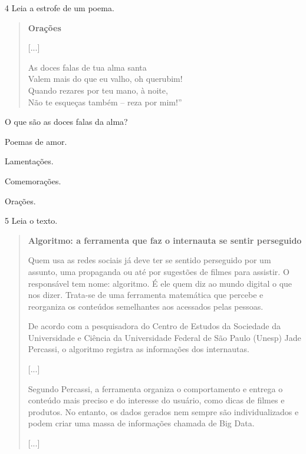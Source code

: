 
\pagebreak
\num{4} Leia a estrofe de um poema.

\begin{verse}
\textbf{Orações}

{[}...{]}

As doces falas de tua alma santa\\
Valem mais do que eu valho, oh querubim!\\
Quando rezares por teu mano, à noite,\\
Não te esqueças também – reza por mim!”

\end{verse}

O que são as doces falas da alma?

\begin{minipage}{.5\textwidth}
\begin{escolha}
\item Poemas de amor.

\item Lamentações.

\item Comemorações.

\item Orações.
\end{escolha}
\end{minipage}

\num{5} Leia o texto.

\begin{quote}
\textbf{Algoritmo: a ferramenta que faz o internauta se sentir perseguido}

Quem usa as redes sociais já deve ter se sentido perseguido por um assunto, uma propaganda ou até por sugestões de filmes para assistir. O responsável tem nome: algoritmo. É ele quem diz ao mundo digital o que nos dizer. Trata-se de uma ferramenta matemática que percebe e reorganiza os conteúdos semelhantes aos acessados pelas pessoas.

De acordo com a pesquisadora do Centro de Estudos da Sociedade da Universidade e Ciência da Universidade Federal de São Paulo (Unesp) Jade Percassi, o algoritmo registra as informações dos internautas.

{[}...{]}

Segundo Percassi, a ferramenta organiza o comportamento e entrega o conteúdo mais preciso e do interesse do usuário, como dicas de filmes e produtos. No entanto, os dados gerados nem sempre são individualizados e podem criar uma massa de informações chamada de Big Data.

{[}...{]}
\end{quote}

